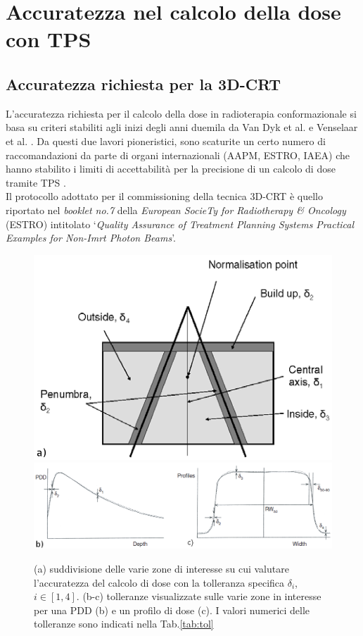 \section{Accuratezza nel calcolo della dose con TPS}
\subsection{Accuratezza richiesta per la 3D-CRT}
\label{sec:accu_3D}
L'accuratezza richiesta per il calcolo della dose in radioterapia conformazionale si basa su criteri stabiliti agli inizi degli anni duemila da Van Dyk et al. e Venselaar et al. \cite{Dyk1993,Venselaar2001}. Da questi due lavori pioneristici, sono scaturite un certo numero di raccomandazioni da parte di organi internazionali (AAPM, ESTRO, IAEA) che hanno stabilito i limiti di accettabilità per la precisione di un calcolo di dose tramite TPS \cite{Fraass1998,Mijnheer2004,IAEA430}.\\
Il protocollo adottato per il commissioning della tecnica 3D-CRT è quello riportato nel \textit{booklet no.7} della \textit{European SocieTy for Radiotherapy \& Oncology} (ESTRO) intitolato `\textit{Quality Assurance of Treatment Planning Systems Practical Examples for Non-Imrt Photon Beams}'. 
\begin{figure}[!t]
\centering
\includegraphics[width=.65\textwidth]{./cap2/Accuracy_zones.png}\\\vspace{.3cm}
\includegraphics[width=\textwidth]{./cap2/Accuracy_pdd_prof.png}
\caption{(a) suddivisione delle varie zone di interesse su cui valutare l'accuratezza del calcolo di dose con la tolleranza specifica $\delta_i$, $i\in[1,4]$. (b-c) tolleranze visualizzate sulle varie zone in interesse per una PDD (b) e un profilo di dose (c). I valori numerici delle tolleranze sono indicati nella Tab.\ref{tab:tol}}
\label{fig:accuracy_zones}
\end{figure}

